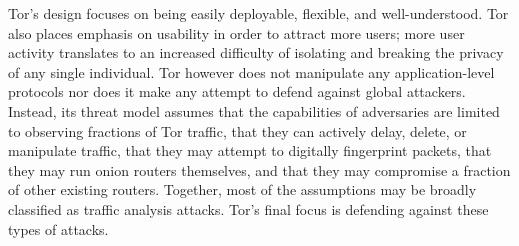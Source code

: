 Tor's design focuses on being easily deployable, flexible, and well-understood. Tor also places emphasis on usability in order to attract more users; more user activity translates to an increased difficulty of isolating and breaking the privacy of any single individual. Tor however does not manipulate any application-level protocols nor does it make any attempt to defend against global attackers. Instead, its threat model assumes that the capabilities of adversaries are limited to observing fractions of Tor traffic, that they can actively delay, delete, or manipulate traffic, that they may attempt to digitally fingerprint packets, that they may run onion routers themselves, and that they may compromise a fraction of other existing routers. Together, most of the assumptions may be broadly classified as traffic analysis attacks. Tor's final focus is defending against these types of attacks.\cite{dingledine2004tor}

